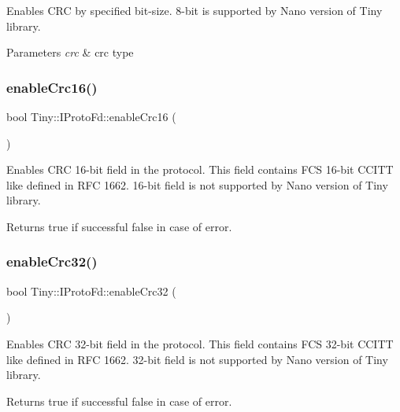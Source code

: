 Enables C\+RC by specified bit-\/size. 8-\/bit is supported by Nano version of Tiny library. 
\begin{DoxyParams}{Parameters}
{\em crc} & crc type \\
\hline
\end{DoxyParams}
\mbox{\label{classTiny_1_1IProtoFd_a8b57afdb66434aa35409af34b04e1db9}} 
\subsubsection{\texorpdfstring{enable\+Crc16()}{enableCrc16()}}
{\footnotesize\ttfamily bool Tiny\+::\+I\+Proto\+Fd\+::enable\+Crc16 (\begin{DoxyParamCaption}{ }\end{DoxyParamCaption})}

Enables C\+RC 16-\/bit field in the protocol. This field contains F\+CS 16-\/bit C\+C\+I\+TT like defined in R\+FC 1662. 16-\/bit field is not supported by Nano version of Tiny library. \begin{DoxyReturn}{Returns}
true if successful false in case of error. 
\end{DoxyReturn}
\mbox{\label{classTiny_1_1IProtoFd_a1bf1f5211ae3a49caf73ee3de3bb9247}} 
\subsubsection{\texorpdfstring{enable\+Crc32()}{enableCrc32()}}
{\footnotesize\ttfamily bool Tiny\+::\+I\+Proto\+Fd\+::enable\+Crc32 (\begin{DoxyParamCaption}{ }\end{DoxyParamCaption})}

Enables C\+RC 32-\/bit field in the protocol. This field contains F\+CS 32-\/bit C\+C\+I\+TT like defined in R\+FC 1662. 32-\/bit field is not supported by Nano version of Tiny library. \begin{DoxyReturn}{Returns}
true if successful false in case of error. 
\end{DoxyReturn}
\mbox{\label{classTiny_1_1IProtoFd_ad17e76d0ef7ea40838e51acc2498c482}} 
